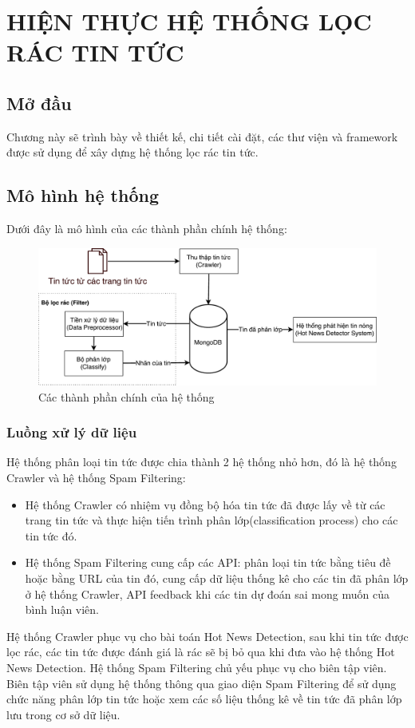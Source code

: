 \chapter{HIỆN THỰC HỆ THỐNG LỌC RÁC TIN TỨC}
\ifpdf
    \graphicspath{{Chapter3/Chapter3Figs/PNG/}{Chapter3/Chapter3Figs/PDF/}{Chapter3/Chapter3Figs/}}
\else
    \graphicspath{{Chapter3/Chapter3Figs/EPS/}{Chapter3/Chapter3Figs/}}
\fi

\section{Mở đầu}
Chương này sẽ trình bày về thiết kế, chi tiết cài đặt, các thư viện và framework được sử dụng để xây dựng hệ thống lọc rác tin tức.

\section{Mô hình hệ thống}
Dưới đây là mô hình của các thành phần chính hệ thống:
\begin{figure}[H]
	\centering
	\includegraphics[width=0.9\linewidth]{Chapter3/Chapter3Figs/PDF/SystemArchitecture}
	\caption{Các thành phần chính của hệ thống}
	\label{fig:systemarchitecture}
\end{figure}
\subsection{Luồng xử lý dữ liệu}
	Hệ thống phân loại tin tức được chia thành 2 hệ thống nhỏ hơn, đó là hệ thống Crawler và hệ thống Spam Filtering: 
	\begin{itemize}
		\item Hệ thống Crawler có nhiệm vụ đồng bộ hóa tin tức đã được lấy về từ các trang tin tức và thực hiện tiến trình phân lớp(classification process) cho các tin tức đó.
		\item Hệ thống Spam Filtering cung cấp các API: phân loại tin tức bằng tiêu đề hoặc bằng URL của tin đó, cung cấp dữ liệu thống kê cho các tin đã phân lớp ở hệ thống Crawler, API feedback khi các tin dự đoán sai mong muốn của bình luận viên.
	\end{itemize}
Hệ thống Crawler phục vụ cho bài toán Hot News Detection, sau khi tin tức được lọc rác, các tin tức được đánh giá là rác sẽ bị bỏ qua khi đưa vào hệ thống Hot News Detection.
Hệ thống Spam Filtering chủ yếu phục vụ cho biên tập viên. Biên tập viên sử dụng hệ thống thông qua giao diện Spam Filtering để sử dụng chức năng phân lớp tin tức hoặc xem các số liệu thống kê về tin tức đã phân lớp lưu trong cơ sở dữ liệu.
